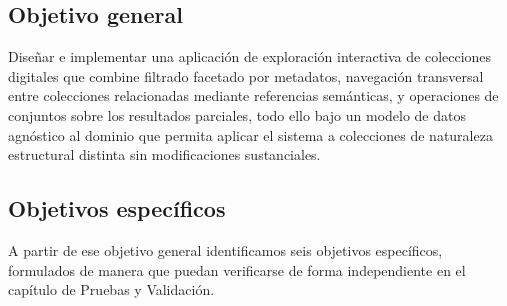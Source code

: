 \subsection*{Objetivo general}

Diseñar e implementar una aplicación de exploración interactiva de colecciones digitales que
combine filtrado facetado por metadatos, navegación transversal entre colecciones relacionadas
mediante referencias semánticas, y operaciones de conjuntos sobre los resultados parciales, todo
ello bajo un modelo de datos agnóstico al dominio que permita aplicar el sistema a colecciones
de naturaleza estructural distinta sin modificaciones sustanciales.

\subsection*{Objetivos específicos}

A partir de ese objetivo general identificamos seis objetivos específicos, formulados de manera
que puedan verificarse de forma independiente en el capítulo de Pruebas y Validación.

